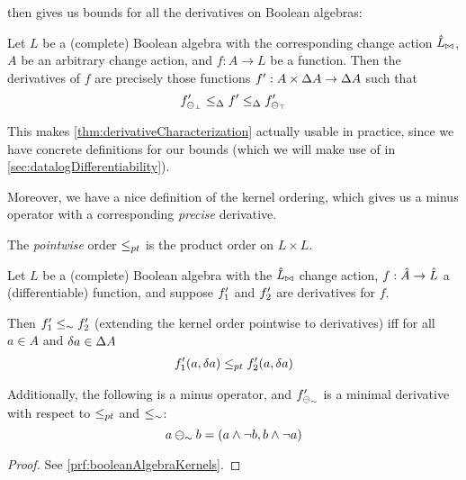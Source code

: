 then gives us bounds for
all the derivatives on Boolean algebras:

\begin{corollary}
\label{cor:booleanCharacterization}
  Let $L$ be a (complete) Boolean algebra with the corresponding change action
  $\hat{L}_{\bowtie}$, $A$ be an arbitrary change action, and $f: A \rightarrow
  L$ be a function. Then the derivatives of $f$ are precisely those functions
  $f': A \times \Delta A \rightarrow \Delta A$ such that
  \begin{displaymath}
    f'_{\ominus_{\bot}}
    \leq_\Delta
    f'
    \leq_\Delta
    f'_{\ominus_{\top}}
  \end{displaymath}
\end{corollary}

This makes \cref{thm:derivativeCharacterization} actually usable in practice, since
we have concrete definitions for our bounds (which we will make use of in \cref{sec:datalogDifferentiability}).

Moreover, we have a nice definition of the kernel ordering, which gives us a
minus operator with a corresponding \emph{precise} derivative.

\begin{defn}
  The \emph{pointwise} order $\leq_{pt}$ is the product order on $L \times
  L$.
\end{defn}

\begin{prop}[name=Boolean algebra kernels, restate=booleanAlgebraKernels]
  \label{prop:booleanAlgebraKernels}
  Let $L$ be a (complete) Boolean algebra with the $\hat{L}_{\bowtie}$ change action,
  $f: \hat{A} \rightarrow \hat{L}$ a (differentiable) function, and suppose 
  $f'_1$ and $f'_2$ are derivatives for $f$.

  Then $f'_1 \leq_\sim f'_2$ (extending the kernel order pointwise to derivatives)
  iff for all $a \in A$ and $\delta a \in \Delta A$
  \begin{align*}
    f'_1(a, \delta a) \leq_{pt} f'_2(a, \delta a)
  \end{align*}

  Additionally, the following is a minus operator, and $f'_{\ominus_\sim}$ is a minimal
  derivative with respect to $\leq_{pt}$ and $\leq_\sim$:
  \begin{displaymath}
    a \ominus_\sim b = (a \wedge \neg b, b \wedge \neg a)
  \end{displaymath}
\end{prop}
\ifproofs
\begin{proof}
  See \cref{prf:booleanAlgebraKernels}.
\end{proof}
\fi

